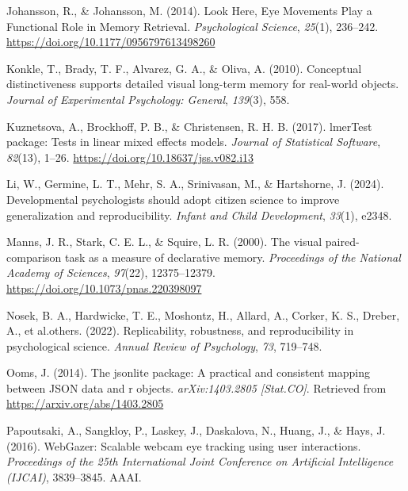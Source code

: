\documentclass[
  man,floatsintext]{apa6}
\newlength{\cslhangindent}
\newenvironment{CSLReferences}[2] %
 {\begin{list}{}{%
  \setlength{\itemindent}{0pt}
  \setlength{\leftmargin}{0pt}
  \setlength{\parsep}{0pt}
  \ifodd #1
   \setlength{\leftmargin}{\cslhangindent}
   \setlength{\itemindent}{-1\cslhangindent}
  \fi
  \setlength{\itemsep}{#2\baselineskip}}}
 {\end{list}}
\begin{document}
\begin{CSLReferences}{1}{0}
Johansson, R., \& Johansson, M. (2014). Look {Here}, {Eye Movements Play} a {Functional Role} in {Memory Retrieval}. \emph{Psychological Science}, \emph{25}(1), 236--242. \url{https://doi.org/10.1177/0956797613498260}

Konkle, T., Brady, T. F., Alvarez, G. A., \& Oliva, A. (2010). Conceptual distinctiveness supports detailed visual long-term memory for real-world objects. \emph{Journal of Experimental Psychology: General}, \emph{139}(3), 558.

Kuznetsova, A., Brockhoff, P. B., \& Christensen, R. H. B. (2017). {lmerTest} package: Tests in linear mixed effects models. \emph{Journal of Statistical Software}, \emph{82}(13), 1--26. \url{https://doi.org/10.18637/jss.v082.i13}

Li, W., Germine, L. T., Mehr, S. A., Srinivasan, M., \& Hartshorne, J. (2024). Developmental psychologists should adopt citizen science to improve generalization and reproducibility. \emph{Infant and Child Development}, \emph{33}(1), e2348.

Manns, J. R., Stark, C. E. L., \& Squire, L. R. (2000). The visual paired-comparison task as a measure of declarative memory. \emph{Proceedings of the National Academy of Sciences}, \emph{97}(22), 12375--12379. \url{https://doi.org/10.1073/pnas.220398097}

Nosek, B. A., Hardwicke, T. E., Moshontz, H., Allard, A., Corker, K. S., Dreber, A., et al.others. (2022). Replicability, robustness, and reproducibility in psychological science. \emph{Annual Review of Psychology}, \emph{73}, 719--748.

Ooms, J. (2014). The jsonlite package: A practical and consistent mapping between JSON data and r objects. \emph{arXiv:1403.2805 {[}Stat.CO{]}}. Retrieved from \url{https://arxiv.org/abs/1403.2805}

Papoutsaki, A., Sangkloy, P., Laskey, J., Daskalova, N., Huang, J., \& Hays, J. (2016). {WebGazer}: {Scalable} webcam eye tracking using user interactions. \emph{Proceedings of the 25th International Joint Conference on Artificial Intelligence ({IJCAI})}, 3839--3845. {AAAI}.


\end{CSLReferences}
\end{document}
